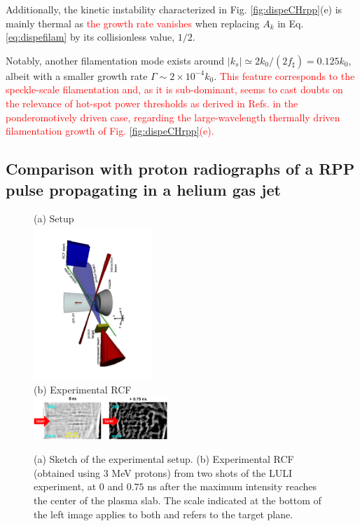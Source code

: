 \documentclass[
 reprint,
 superscriptaddress,
 amsmath,amssymb,
 aps,
]{revtex4-1}
\def\tc{\textcolor{red}}
\begin{document}
Additionally, the kinetic instability characterized in Fig. \ref{fig:dispeCHrpp}(e)  is mainly thermal as \tc{ the growth rate vanishes} when   replacing  $A_k$ in Eq. \eqref{eq:dispefilam} by its collisionless value, $1/2$. 

Notably, another filamentation mode exists around  $\vert k_s\vert \simeq 2k_0/(2f_\sharp) = 0.125k_0$, albeit with a smaller growth rate $\Gamma\sim 2\times 10^{-4}k_0 $. \tc{This feature corresponds to the speckle-scale filamentation and, as it is sub-dominant, seems to cast doubts on the relevance of  hot-spot power thresholds as derived in Refs. \cite[]{POF_Max_1976,POP_Williams_2006} in the ponderomotively driven case,  regarding the large-wavelength thermally driven  filamentation growth of Fig.   \ref{fig:dispeCHrpp}(e).}

\subsection{Comparison with proton radiographs of a RPP pulse propagating in a helium gas jet}\label{sec:xp}
\begin{figure}
(a) Setup \\
\includegraphics[width=0.4\textwidth,angle=-90]{set_up.pdf}\\
(b) Experimental RCF \\
\includegraphics[width=0.45\textwidth]{rcf.eps}
\caption{ \label{fig:xpfuchs_xp}  
(a) Sketch of the experimental setup.
(b) Experimental RCF (obtained using 3 MeV protons) from two shots of the LULI experiment, at $0$ and $0.75$ ns after the maximum intensity reaches the center of the plasma slab.  The scale indicated at the bottom of the left image applies to both and refers to the target plane. 
 }
\end{figure}
\end{document}
